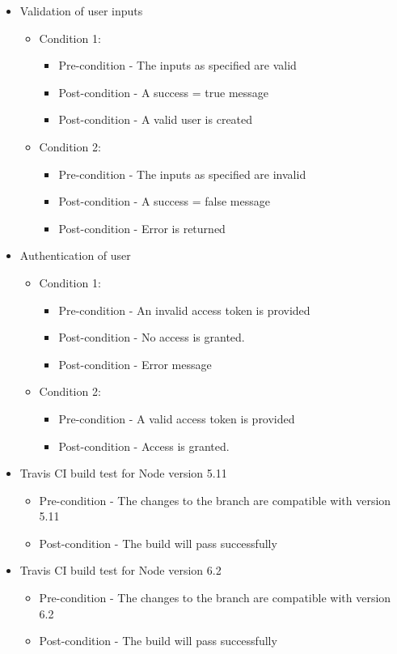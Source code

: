 \documentclass{article}
\begin{document}
\begin{itemize}
\item Validation of user inputs
\begin{itemize}
	\item Condition 1:
	\begin{itemize}
		\item Pre-condition - The inputs as specified are valid
		\item Post-condition - A success = true message
		\item Post-condition - A valid user is created
	\end{itemize}
	\item Condition 2:
	\begin{itemize}
		\item Pre-condition - The inputs as specified are invalid
		\item Post-condition - A success = false message
		\item Post-condition - Error is returned
	\end{itemize}
\end{itemize}

\item Authentication of user
\begin{itemize}
	\item Condition 1:
	\begin{itemize}
		\item Pre-condition - An invalid access token is provided
		\item Post-condition - No access is granted.
		\item Post-condition - Error message 
	\end{itemize}
	\item Condition 2:
	\begin{itemize}
		\item Pre-condition - A valid access token is provided
		\item Post-condition - Access is granted.
	\end{itemize}
\end{itemize}


\item Travis CI build test for Node version 5.11
	\begin{itemize}
	\item Pre-condition - The changes to the branch are compatible with version 5.11
	\item Post-condition - The build will pass successfully 
	\end{itemize}	
	
\item Travis CI build test for Node version 6.2
	\begin{itemize}
	\item Pre-condition - The changes to the branch are compatible with version 6.2
	\item Post-condition - The build will pass successfully 
	\end{itemize}

\end{itemize}
\end{document}
